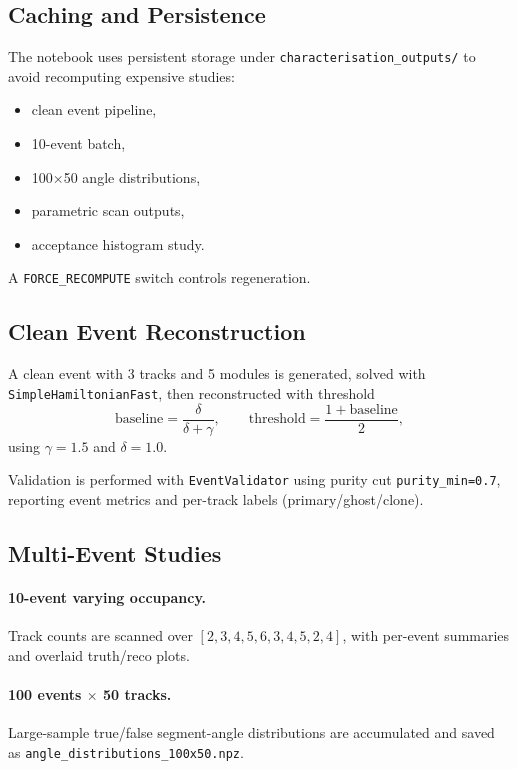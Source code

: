 \documentclass[11pt,a4paper]{article}
\begin{document}
\subsection{Caching and Persistence}
The notebook uses persistent storage under
\texttt{characterisation\_outputs/} to avoid recomputing expensive studies:
\begin{itemize}[leftmargin=1.5em]
  \item clean event pipeline,
  \item 10-event batch,
  \item 100$\times$50 angle distributions,
  \item parametric scan outputs,
  \item acceptance histogram study.
\end{itemize}
A \texttt{FORCE\_RECOMPUTE} switch controls regeneration.

\subsection{Clean Event Reconstruction}
A clean event with 3 tracks and 5 modules is generated, solved with
\texttt{SimpleHamiltonianFast}, then reconstructed with threshold
\begin{equation}
\text{baseline} = \frac{\delta}{\delta+\gamma},
\qquad
\text{threshold} = \frac{1+\text{baseline}}{2},
\end{equation}
using $\gamma=1.5$ and $\delta=1.0$.

Validation is performed with \texttt{EventValidator} using purity cut
\texttt{purity\_min=0.7}, reporting event metrics and per-track labels
(primary/ghost/clone).

\subsection{Multi-Event Studies}
\paragraph{10-event varying occupancy.}
Track counts are scanned over
\([2,3,4,5,6,3,4,5,2,4]\), with per-event summaries and overlaid truth/reco
plots.

\paragraph{100 events $\times$ 50 tracks.}
Large-sample true/false segment-angle distributions are accumulated and saved as
\texttt{angle\_distributions\_100x50.npz}.
\end{document}
